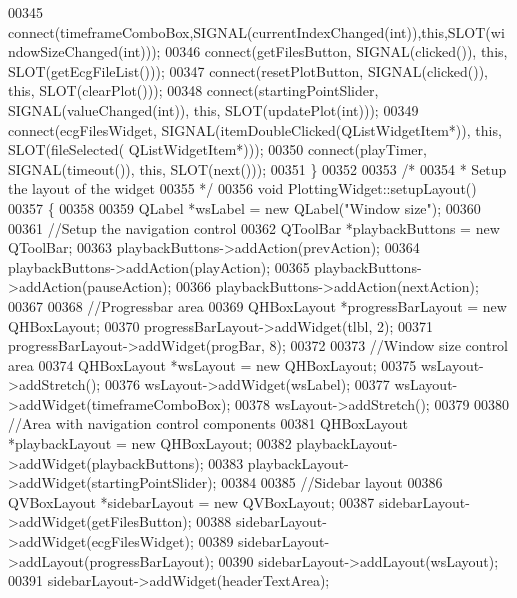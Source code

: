 \begin{DoxyCode}
00345     connect(timeframeComboBox,SIGNAL(currentIndexChanged(\textcolor{keywordtype}{int})),\textcolor{keyword}{this},SLOT(windowSizeChanged(\textcolor{keywordtype}{int})));
00346     connect(getFilesButton, SIGNAL(clicked()), \textcolor{keyword}{this}, SLOT(getEcgFileList()));
00347     connect(resetPlotButton, SIGNAL(clicked()), \textcolor{keyword}{this}, SLOT(clearPlot()));
00348     connect(startingPointSlider, SIGNAL(valueChanged(\textcolor{keywordtype}{int})), \textcolor{keyword}{this}, SLOT(updatePlot(\textcolor{keywordtype}{int})));
00349     connect(ecgFilesWidget, SIGNAL(itemDoubleClicked(QListWidgetItem*)), \textcolor{keyword}{this}, SLOT(fileSelected(
      QListWidgetItem*)));
00350     connect(playTimer, SIGNAL(timeout()), \textcolor{keyword}{this}, SLOT(next()));
00351 \}
00352 
00353 \textcolor{comment}{/*}
00354 \textcolor{comment}{ * Setup the layout of the widget}
00355 \textcolor{comment}{ */}
00356 \textcolor{keywordtype}{void} PlottingWidget::setupLayout()
00357 \{
00358 
00359     QLabel *wsLabel = \textcolor{keyword}{new} QLabel(\textcolor{stringliteral}{"Window size"});
00360 
00361     \textcolor{comment}{//Setup the navigation control}
00362     QToolBar *playbackButtons = \textcolor{keyword}{new} QToolBar;
00363     playbackButtons->addAction(prevAction);
00364     playbackButtons->addAction(playAction);
00365     playbackButtons->addAction(pauseAction);
00366     playbackButtons->addAction(nextAction);
00367 
00368     \textcolor{comment}{//Progressbar area}
00369     QHBoxLayout *progressBarLayout = \textcolor{keyword}{new} QHBoxLayout;
00370     progressBarLayout->addWidget(tlbl, 2);
00371     progressBarLayout->addWidget(progBar, 8);
00372 
00373     \textcolor{comment}{//Window size control area}
00374     QHBoxLayout *wsLayout = \textcolor{keyword}{new} QHBoxLayout;
00375     wsLayout->addStretch();
00376     wsLayout->addWidget(wsLabel);
00377     wsLayout->addWidget(timeframeComboBox);
00378     wsLayout->addStretch();
00379 
00380     \textcolor{comment}{//Area with navigation control components}
00381     QHBoxLayout *playbackLayout = \textcolor{keyword}{new} QHBoxLayout;
00382     playbackLayout->addWidget(playbackButtons);
00383     playbackLayout->addWidget(startingPointSlider);
00384 
00385     \textcolor{comment}{//Sidebar layout}
00386     QVBoxLayout *sidebarLayout = \textcolor{keyword}{new} QVBoxLayout;
00387     sidebarLayout->addWidget(getFilesButton);
00388     sidebarLayout->addWidget(ecgFilesWidget);
00389     sidebarLayout->addLayout(progressBarLayout);
00390     sidebarLayout->addLayout(wsLayout);
00391     sidebarLayout->addWidget(headerTextArea);

\end{DoxyCode}
